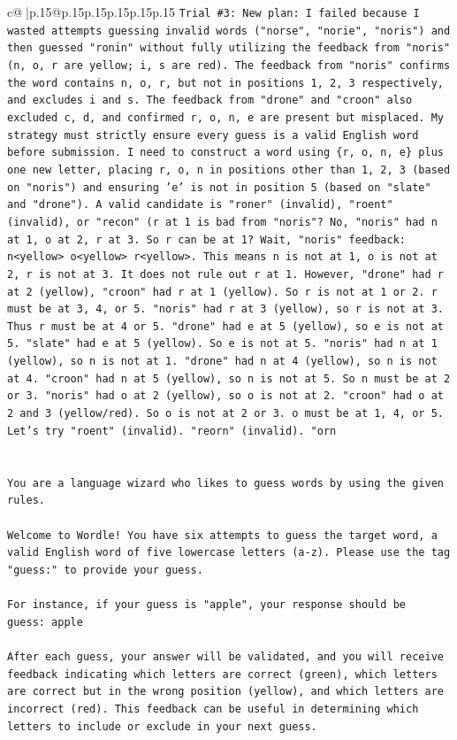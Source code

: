 \documentclass{article}
\begin{document}
{\begin{supertabular}{c@{$\;$}|p{.15\linewidth}@{}p{.15\linewidth}p{.15\linewidth}p{.15\linewidth}p{.15\linewidth}p{.15\linewidth}}
{{{\texttt{Trial \#3: New plan: I failed because I wasted attempts guessing invalid words ("norse", "norie", "noris") and then guessed "ronin" without fully utilizing the feedback from "noris" (n, o, r are yellow; i, s are red). The feedback from "noris" confirms the word contains n, o, r, but not in positions 1, 2, 3 respectively, and excludes i and s. The feedback from "drone" and "croon" also excluded c, d, and confirmed r, o, n, e are present but misplaced. My strategy must strictly ensure every guess is a valid English word before submission. I need to construct a word using \{r, o, n, e\} plus one new letter, placing r, o, n in positions other than 1, 2, 3 (based on "noris") and ensuring 'e' is not in position 5 (based on "slate" and "drone"). A valid candidate is "roner" (invalid), "roent" (invalid), or "recon" (r at 1 is bad from "noris"? No, "noris" had n at 1, o at 2, r at 3. So r can be at 1? Wait, "noris" feedback: n<yellow> o<yellow> r<yellow>. This means n is not at 1, o is not at 2, r is not at 3. It does not rule out r at 1. However, "drone" had r at 2 (yellow), "croon" had r at 1 (yellow). So r is not at 1 or 2. r must be at 3, 4, or 5. "noris" had r at 3 (yellow), so r is not at 3. Thus r must be at 4 or 5. "drone" had e at 5 (yellow), so e is not at 5. "slate" had e at 5 (yellow). So e is not at 5. "noris" had n at 1 (yellow), so n is not at 1. "drone" had n at 4 (yellow), so n is not at 4. "croon" had n at 5 (yellow), so n is not at 5. So n must be at 2 or 3. "noris" had o at 2 (yellow), so o is not at 2. "croon" had o at 2 and 3 (yellow/red). So o is not at 2 or 3. o must be at 1, 4, or 5. Let's try "roent" (invalid). "reorn" (invalid). "orn} \\
\\ 
\\ 
\texttt{You are a language wizard who likes to guess words by using the given rules.} \\
\\ 
\texttt{Welcome to Wordle! You have six attempts to guess the target word, a valid English word of five lowercase letters (a{-}z). Please use the tag "guess:" to provide your guess.} \\
\\ 
\texttt{For instance, if your guess is "apple", your response should be} \\
\texttt{guess: apple} \\
\\ 
\texttt{After each guess, your answer will be validated, and you will receive feedback indicating which letters are correct (green), which letters are correct but in the wrong position (yellow), and which letters are incorrect (red). This feedback can be useful in determining which letters to include or exclude in your next guess.} \\
}}}
\end{supertabular}}
\end{document}
